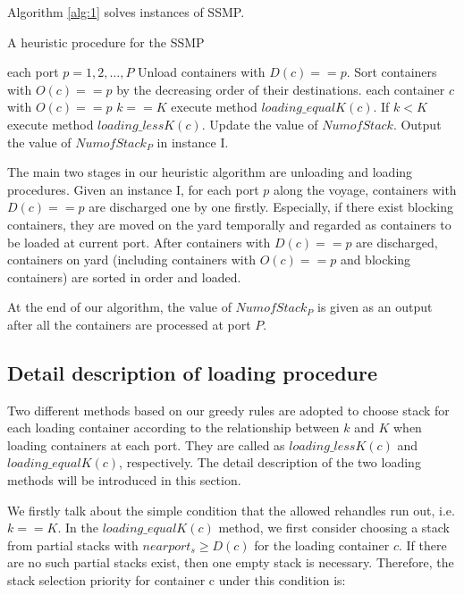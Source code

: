 \documentclass[review,3p,times,authoryear,12pt]{elsarticle}
\begin{document}
Algorithm \ref{alg:1} solves instances of SSMP.

\begin{algorithm}[htbp]
  \caption{A heuristic procedure for the SSMP}
  \label{alg:1}
  \begin{codebox}

    \li \For each port $p=1, 2 , \ldots,P $
    \li \Do
                Unload containers with $D(c)==p$.
    \li         Sort containers with $O(c)==p$ by the decreasing order of their destinations.
    \li         \For each container $c$ with $O(c)==p$
    \li         \Do
                   \If $k==K$
    \li            \Then
                        execute method $loading\_equalK(c)$.
    \li            \Else If $k < K$
    \li                 execute method $loading\_lessK(c)$.
                   \End
                \End
    \li          Update the value of $NumofStack$.
        \End
    \li Output the value of $NumofStack_P$ in instance I.

 \end{codebox}
 \end{algorithm}

The main two stages in our heuristic algorithm are unloading and loading procedures.
Given an instance I, for each port $p$ along the voyage, containers with $D(c)==p$ are discharged one by one firstly.
Especially, if there exist blocking containers, they are moved on the yard temporally and regarded as containers to be loaded at current port.
After containers with $D(c)==p$ are discharged, containers on yard (including containers with $O(c)==p$ and blocking containers) are sorted in order and loaded.

At the end of our algorithm, the value of $NumofStack_P$ is given as an output after all the containers are processed at port $P$.

\subsection{Detail description of loading procedure}
\label{sec:d2}

Two different methods based on our greedy rules are adopted to choose stack for each loading container according to the relationship between $k$ and $K$ when loading containers at each port.
They are called as $loading\_lessK(c)$ and $loading\_equalK(c)$, respectively.
The detail description of the two loading methods will be introduced in this section.

We firstly talk about the simple condition that the allowed rehandles run out, i.e. $k==K$.
In the $loading\_equalK(c)$ method, we first consider choosing a stack from partial stacks with $nearport_s \ge D(c)$ for the loading container $c$.
If there are no such partial stacks exist, then one empty stack is necessary.
Therefore, the stack selection priority for container c under this condition is:
\end{document}
